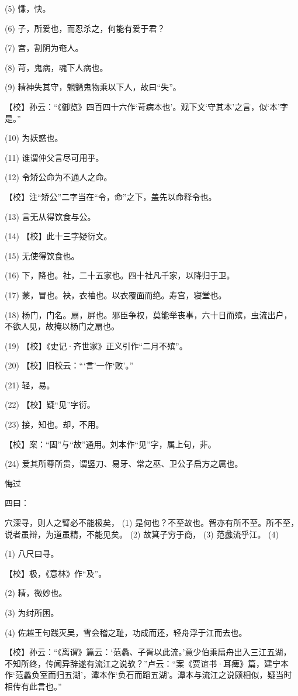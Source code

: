 \documentclass[12pt,UTF8]{ctexbook}
\begin{document}
(5) 慊，快。

(6) 子，所爱也，而忍杀之，何能有爱于君？

(7) 宫，割阴为奄人。

(8) 苛，鬼病，魂下人病也。

(9) 精神失其守，魍魉鬼物乘以下人，故曰“失”。

【校】孙云：“《御览》四百四十六作‘苛病本也’。观下文‘守其本’之言，似‘本’字是。”

(10) 为妖惑也。

(11) 谁谓仲父言尽可用乎。

(12) 令矫公命为不通人之命。

【校】注“矫公”二字当在“令，命”之下，盖先以命释令也。

(13) 言无从得饮食与公。

(14) 【校】此十三字疑衍文。

(15) 无使得饮食也。

(16) 下，降也。社，二十五家也。四十社凡千家，以降归于卫。

(17) 蒙，冒也。袂，衣袖也。以衣覆面而绝。寿宫，寝堂也。

(18) 杨门，门名。扇，屏也。邪臣争权，莫能举丧事，六十日而殡，虫流出户，不欲人见，故掩以杨门之扇也。

(19) 【校】《史记·齐世家》正义引作“二月不殡”。

(20) 【校】旧校云：“‘言’一作‘败’。”

(21) 轻，易。

(22) 【校】疑“见”字衍。

(23) 接，知也。却，不用。

【校】案：“固”与“故”通用。刘本作“见”字，属上句，非。

(24) 爱其所尊所贵，谓竖刀、易牙、常之巫、卫公子启方之属也。





悔过


四曰：

穴深寻，则人之臂必不能极矣， (1) 是何也？不至故也。智亦有所不至。所不至，说者虽辩，为道虽精，不能见矣。 (2) 故箕子穷于商， (3) 范蠡流乎江。 (4)

(1) 八尺曰寻。

【校】极，《意林》作“及”。

(2) 精，微妙也。

(3) 为纣所困。

(4) 佐越王句践灭吴，雪会稽之耻，功成而还，轻舟浮于江而去也。

【校】孙云：“《离谓》篇云：‘范蠡、子胥以此流。’意少伯乘扁舟出入三江五湖，不知所终，传闻异辞遂有流江之说欤？”卢云：“案《贾谊书·耳痺》篇，建宁本作‘范蠡负室而归五湖’，潭本作‘负石而蹈五湖’。潭本与流江之说颇相似，疑当时相传有此言也。”
\end{document}
